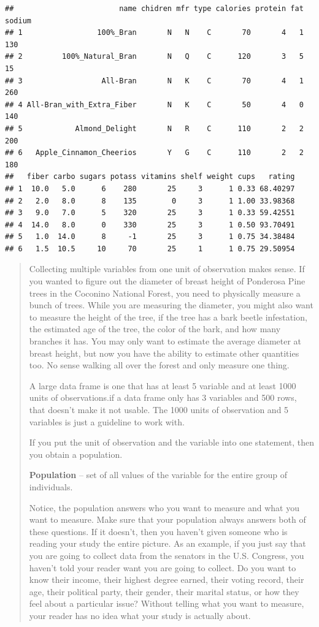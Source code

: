 \documentclass[]{book}
\begin{document}
\begin{verbatim}
##                        name chidren mfr type calories protein fat sodium
## 1                 100%_Bran       N   N    C       70       4   1    130
## 2         100%_Natural_Bran       N   Q    C      120       3   5     15
## 3                  All-Bran       N   K    C       70       4   1    260
## 4 All-Bran_with_Extra_Fiber       N   K    C       50       4   0    140
## 5            Almond_Delight       N   R    C      110       2   2    200
## 6   Apple_Cinnamon_Cheerios       Y   G    C      110       2   2    180
##   fiber carbo sugars potass vitamins shelf weight cups   rating
## 1  10.0   5.0      6    280       25     3      1 0.33 68.40297
## 2   2.0   8.0      8    135        0     3      1 1.00 33.98368
## 3   9.0   7.0      5    320       25     3      1 0.33 59.42551
## 4  14.0   8.0      0    330       25     3      1 0.50 93.70491
## 5   1.0  14.0      8     -1       25     3      1 0.75 34.38484
## 6   1.5  10.5     10     70       25     1      1 0.75 29.50954
\end{verbatim}

\begin{quote}
Collecting multiple variables from one unit of observation makes sense. If you wanted to figure out the diameter of breast height of Ponderosa Pine trees in the Coconino National Forest, you need to physically measure a bunch of trees. While you are measuring the diameter, you might also want to measure the height of the tree, if the tree has a bark beetle infestation, the estimated age of the tree, the color of the bark, and how many branches it has. You may only want to estimate the average diameter at breast height, but now you have the ability to estimate other quantities too. No sense walking all over the forest and only measure one thing.

A large data frame is one that has at least 5 variable and at least 1000 units of observations.if a data frame only has 3 variables and 500 rows, that doesn't make it not usable. The 1000 units of observation and 5 variables is just a guideline to work with.

If you put the unit of observation and the variable into one statement, then you obtain a population.

\textbf{Population} -- set of all values of the variable for the entire group of individuals.

Notice, the population answers who you want to measure and what you want to measure. Make sure that your population always answers both of these questions. If it doesn't, then you haven't given someone who is reading your study the entire picture. As an example, if you just say that you are going to collect data from the senators in the U.S. Congress, you haven't told your reader want you are going to collect. Do you want to know their income, their highest degree earned, their voting record, their age, their political party, their gender, their marital status, or how they feel about a particular issue? Without telling what you want to measure, your reader has no idea what your study is actually about.
\end{quote}
\end{document}
